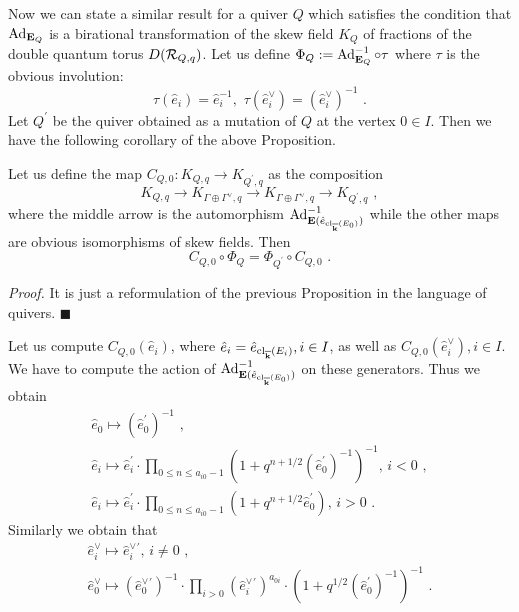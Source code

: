 \documentclass[12pt]{article}
\begin{document}
Now we can state a similar result for a quiver $Q$ which satisfies the condition that $\operatorname{Ad}_{{\bf E}_Q}$ is a birational transformation of the skew field $K_Q$ of fractions of the double quantum torus $D({\cal R}_{Q,q})$.
Let us define $\Phi_Q:=\operatorname{Ad}_{{\bf E}_Q}^{-1}\circ \tau$ where $\tau$ is the obvious
 involution: $$\tau(\hat{e}_i)=\hat{e}_i^{-1},\,\,\tau(\hat{e}^\vee_i)=(\hat{e}^\vee_i)^{-1}\,\,.$$ Let $Q^{\prime}$ be the quiver obtained as a mutation of $Q$ at the vertex $0\in I$.
Then we have the following corollary of the above Proposition.
\begin{cor} Let us define the map $C_{Q,0}: K_{Q,q}\to K_{Q^{\prime},q}$ as the composition
$$K_{Q,q}\to K_{\Gamma\oplus \Gamma^{\vee},q}\to K_{\Gamma\oplus \Gamma^{\vee},q}\to K_{Q^{\prime},q}\,\,,$$ where
the middle arrow is the automorphism $\operatorname{Ad}^{-1}_{{\bf E}(\hat{e}_{\operatorname{cl}_{{\overline{\bf k}}}(E_0)})}$ while the other maps are obvious isomorphisms of skew fields. Then
$$C_{Q,0}\circ \Phi_Q=\Phi_{Q^{\prime}}\circ C_{Q,0}\,\,.$$



\end{cor}

{\it Proof.} It is just a reformulation of the previous Proposition in the language of quivers. $\blacksquare$

Let us compute $C_{Q,0}(\hat{e}_i)$, where $\hat{e}_i=\hat{e}_{\operatorname{cl}_{{\overline{\bf k}}}(E_i)}, i\in I$, as well as $C_{Q,0}(\hat{e}_i^{\vee}), i\in I$.
We have to compute the action of $\operatorname{Ad}^{-1}_{{\bf E}(\hat{e}_{\operatorname{cl}_{{\overline{\bf k}}}(E_0)})}$ on these generators. Thus we obtain
$$\begin{array}{l}\hat{e}_0\mapsto (\hat{e}_0^{\prime})^{-1}\,\,,\\
\hat{e}_i\mapsto \hat{e}_{i}^{\prime}\cdot \prod_{0\leqslant n\leqslant a_{i0}-1}(1+q^{n+1/2}(\hat{e}_0^{\prime})^{-1})^{-1},\, i<0\,\,,\\
\hat{e}_i\mapsto \hat{e}_{i}^{\prime}\cdot \prod_{0\leqslant n\leqslant a_{i0}-1}(1+q^{n+1/2}\hat{e}_0^{\prime}), \,i>0\,\,.
\end{array}$$
Similarly we obtain that
$$\begin{array}{l}\hat{e}_i^{\vee}\mapsto {\hat{e}_i^{\vee}}{}^{\prime},\, i\ne 0\,\,,\\
\hat{e}_0^{\vee}\mapsto ({\hat{e}_0^{\vee}}{}^{\prime})^{-1}\cdot \prod_{i>0}({\hat{e}_i^{\vee}}{}^{\prime})^{a_{0i}}\cdot (1+q^{1/2}(\hat{e}_0^{\prime})^{-1})^{-1}\,\,.\end{array}$$
\end{document}
